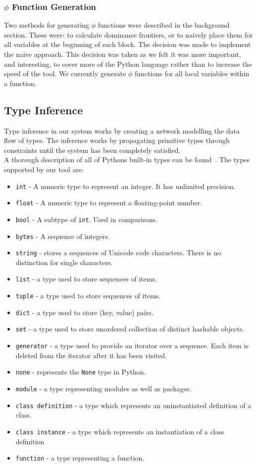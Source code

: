 \documentclass[12pt, titlepage]{article}
\begin{document}
\subsubsection{$\phi$ Function Generation}
Two methods for generating $\phi$ functions were described in the background section. These were: to calculate dominance frontiers, or to naively place them for all variables at the beginning of each block. The decision was made to implement the naive approach. This decision was taken as we felt it was more important, and interesting, to cover more of the Python language rather than to increase the speed of the tool. We currently generate $\phi$ functions for all local variables within a function.

\subsection{Type Inference}
Type inference in our system works by creating a network modelling the data flow of types. The inference works by propagating primitive types through constraints until the system has been completely satisfied. \\
\indent A thorough description of all of Pythons built-in types can be found~\cite{pythonTypeDocs}. The types supported by our tool are:
\begin{itemize}
	\item \texttt{int} - A numeric type to represent an integer. It has unlimited precision.
	\item \texttt{float} - A numeric type to represent a floating-point number.
	\item \texttt{bool} - A subtype of \texttt{int}. Used in comparisons.
	\item \texttt{bytes} - A sequence of integers.
	\item \texttt{string} - stores a sequences of Unicode code characters. There is no distinction for single characters.
	\item \texttt{list} - a type used to store sequences of items.
	\item \texttt{tuple} - a type used to store sequences of items.
	\item \texttt{dict} - a type used to store (key, value) pairs.
	\item \texttt{set} - a type used to store unordered collection of distinct hashable objects.
	\item \texttt{generator} - a type used to provide an iterator over a sequence. Each item is deleted from the iterator after it has been visited.
	\item \texttt{none} - represents the \texttt{None} type in Python.
	\item \texttt{module} - a type representing modules as well as packages.
	\item \texttt{class definition} - a type which represents an uninstantiated definition of a class.
	\item \texttt{class instance} - a type which represents an instantiation of a class definition
	\item \texttt{function} - a type representing a function.
\end{itemize}
\end{document}
